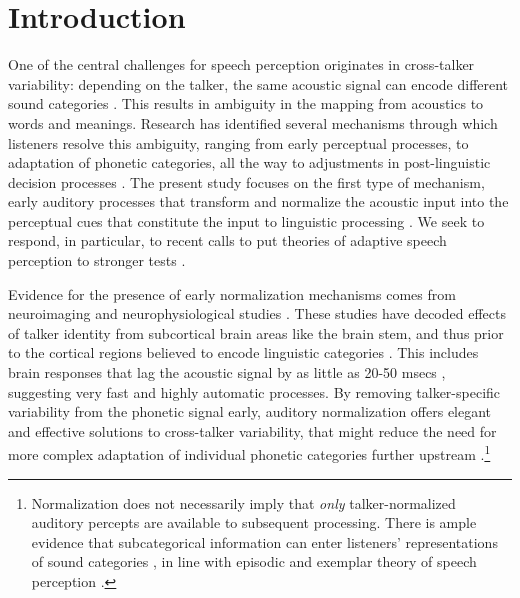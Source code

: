 \documentclass[preprint]{JASA}
\begin{document}
\section{Introduction}\label{sec:intro}

One of the central challenges for speech perception originates in cross-talker variability: depending on the talker, the same acoustic signal can encode different sound categories \citep{allen2003, liberman1967, newman2001}. This results in ambiguity in the mapping from acoustics to words and meanings. Research has identified several mechanisms through which listeners resolve this ambiguity, ranging from early perceptual processes, to adaptation of phonetic categories, all the way to adjustments in post-linguistic decision processes \citep[for review, see][]{xie2023}. The present study focuses on the first type of mechanism, early auditory processes that transform and normalize the acoustic input into the perceptual cues that constitute the input to linguistic processing \citep[for reviews,][]{barreda2020, johnson-sjerps2021, mcmurray-jongman2011, stilp2020, weatherholtz-jaeger2016}. We seek to respond, in particular, to recent calls to put theories of adaptive speech perception to stronger tests \citep{baeseberk2018, schertz-clare2020, xie2023}.

Evidence for the presence of early normalization mechanisms comes from neuroimaging and neurophysiological studies \citep[e.g.,][]{oganian2023, skoe2021}. These studies have decoded effects of talker identity from subcortical brain areas like the brain stem, and thus prior to the cortical regions believed to encode linguistic categories \citep[e.g.,][]{sjerps2019, tang2017}. This includes brain responses that lag the acoustic signal by as little as 20-50 msecs \citep{lee2009}, suggesting very fast and highly automatic processes. By removing talker-specific variability from the phonetic signal early, auditory normalization offers elegant and effective solutions to cross-talker variability, that might reduce the need for more complex adaptation of individual phonetic categories further upstream \citep{apfelbaum-mcmurray2015, xie2023}.\footnote{Normalization does not necessarily imply that \emph{only} talker-normalized auditory percepts are available to subsequent processing. There is ample evidence that subcategorical information can enter listeners' representations of sound categories \citep[e.g.,][]{hay2017, hay2019, johnson1999, mcgowan2015, walker-hay2011}, in line with episodic \citep{goldinger1996} and exemplar theory of speech perception \citep{johnson1997, sumner2011}.}
\end{document}
